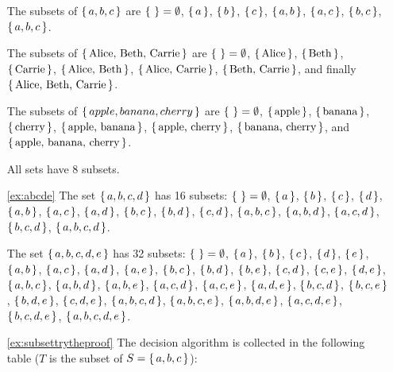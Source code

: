 \begin{enumerate}
The subsets of $\left\{\,a, b, c\,\right\}$ are 
$\left\{\,\,\right\} = \emptyset$, 
$\left\{\,a\,\right\}$, $\left\{\,b\,\right\}$, $\left\{\,c\,\right\}$, 
$\left\{\,a, b\,\right\}$, $\left\{\,a, c\,\right\}$, $\left\{\,b, c\,\right\}$, 
$\left\{\,a, b, c\,\right\}$. 

The subsets of $\left\{\,\text{Alice, Beth, Carrie}\,\right\}$ are 
$\left\{\,\,\right\} = \emptyset$, 
$\left\{\,\text{Alice}\,\right\}$, $\left\{\,\text{Beth}\,\right\}$, $\left\{\,\text{Carrie}\,\right\}$, 
$\left\{\,\text{Alice, Beth}\,\right\}$, $\left\{\,\text{Alice, Carrie}\,\right\}$, $\left\{\,\text{Beth, Carrie}\,\right\}$, 
and finally $\left\{\,\text{Alice, Beth, Carrie}\,\right\}$. 

The subsets of $\left\{\,apple, banana, cherry\,\right\}$ are 
$\left\{\,\,\right\} = \emptyset$, 
$\left\{\,\text{apple}\,\right\}$, $\left\{\,\text{banana}\,\right\}$, $\left\{\,\text{cherry}\,\right\}$, 
$\left\{\,\text{apple, banana}\,\right\}$, $\left\{\,\text{apple, cherry}\,\right\}$, $\left\{\,\text{banana, cherry}\,\right\}$, 
and $\left\{\,\text{apple, banana, cherry}\,\right\}$. 

All sets have 8 subsets. 

\item[\ref{ex:abcde}]
The set $\left\{\,a, b, c, d\,\right\}$ has 16 subsets: 
$\left\{\,\,\right\} = \emptyset$, 
$\left\{\,a\,\right\}$, $\left\{\,b\,\right\}$, $\left\{\,c\,\right\}$, $\left\{\,d\,\right\}$, 
$\left\{\,a, b\,\right\}$, $\left\{\,a, c\,\right\}$, $\left\{\,a, d\,\right\}$, $\left\{\,b, c\,\right\}$, $\left\{\,b, d\,\right\}$, $\left\{\,c, d\,\right\}$, 
$\left\{\,a, b, c\,\right\}$, $\left\{\,a, b, d\,\right\}$, $\left\{\,a, c, d\,\right\}$, $\left\{\,b, c, d\,\right\}$, 
$\left\{\,a, b, c, d\,\right\}$. 

The set $\left\{\,a, b, c, d, e\,\right\}$ has 32 subsets: 
$\left\{\,\,\right\} = \emptyset$, 
$\left\{\,a\,\right\}$, $\left\{\,b\,\right\}$, $\left\{\,c\,\right\}$, $\left\{\,d\,\right\}$, $\left\{\,e\,\right\}$, 
$\left\{\,a, b\,\right\}$, $\left\{\,a, c\,\right\}$, $\left\{\,a, d\,\right\}$, $\left\{\,a, e\,\right\}$, $\left\{\,b, c\,\right\}$, 
$\left\{\,b, d\,\right\}$, $\left\{\,b, e\,\right\}$, $\left\{\,c, d\,\right\}$, $\left\{\,c, e\,\right\}$, $\left\{\,d, e\,\right\}$, 
$\left\{\,a, b, c\,\right\}$, $\left\{\,a, b, d\,\right\}$, $\left\{\,a, b, e\,\right\}$, $\left\{\,a, c, d\,\right\}$, $\left\{\,a, c, e\,\right\}$,
$\left\{\,a, d, e\,\right\}$, $\left\{\,b, c, d\,\right\}$, $\left\{\,b, c, e\,\right\}$, $\left\{\,b, d, e\,\right\}$, $\left\{\,c, d, e\,\right\}$,
$\left\{\,a, b, c, d\,\right\}$, $\left\{\,a, b, c, e\,\right\}$, $\left\{\,a, b, d, e\,\right\}$, $\left\{\,a, c, d, e\,\right\}$, $\left\{\,b, c, d, e\,\right\}$,  
$\left\{\,a, b, c, d, e\,\right\}$. 



\item[\ref{ex:subsettrytheproof}]
The decision algorithm is collected in 
the following table ($T$ is the subset of $S = \left\{\,a, b, c\,\right\}$): 


\end{enumerate}
